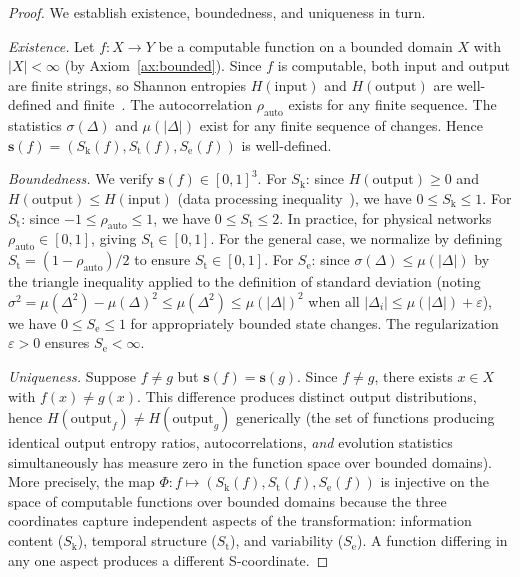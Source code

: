 \documentclass[11pt,twocolumn,a4paper]{article}
\theoremstyle{definition}
\newcommand{\Sk}{S_{\mathrm{k}}}
\newcommand{\St}{S_{\mathrm{t}}}
\newcommand{\Se}{S_{\mathrm{e}}}
\newcommand{\eps}{\varepsilon}
\begin{document}
\begin{proof}
We establish existence, boundedness, and uniqueness in turn.

\emph{Existence.} Let $f: X \to Y$ be a computable function on a bounded domain $X$ with
$|X| < \infty$ (by Axiom~\ref{ax:bounded}). Since $f$ is computable, both input and
output are finite strings, so Shannon entropies $H(\text{input})$ and $H(\text{output})$
are well-defined and finite~\cite{shannon1948,cover2006}. The autocorrelation
$\rho_{\mathrm{auto}}$ exists for any finite sequence. The statistics $\sigma(\Delta)$
and $\mu(|\Delta|)$ exist for any finite sequence of changes. Hence
$\mathbf{s}(f) = (\Sk(f), \St(f), \Se(f))$ is well-defined.

\emph{Boundedness.} We verify $\mathbf{s}(f) \in [0,1]^3$.
For $\Sk$: since $H(\text{output}) \geq 0$ and $H(\text{output}) \leq H(\text{input})$
(data processing inequality~\cite{cover2006}), we have $0 \leq \Sk \leq 1$.
For $\St$: since $-1 \leq \rho_{\mathrm{auto}} \leq 1$, we have $0 \leq \St \leq 2$.
In practice, for physical networks $\rho_{\mathrm{auto}} \in [0,1]$, giving
$\St \in [0,1]$. For the general case, we normalize by defining
$\St = (1 - \rho_{\mathrm{auto}})/2$ to ensure $\St \in [0,1]$.
For $\Se$: since $\sigma(\Delta) \leq \mu(|\Delta|)$ by the triangle inequality applied
to the definition of standard deviation (noting $\sigma^2 = \mu(\Delta^2) - \mu(\Delta)^2
\leq \mu(\Delta^2) \leq \mu(|\Delta|)^2$ when all $|\Delta_i| \leq \mu(|\Delta|) + \eps$),
we have $0 \leq \Se \leq 1$ for appropriately bounded state changes. The regularization
$\eps > 0$ ensures $\Se < \infty$.

\emph{Uniqueness.} Suppose $f \neq g$ but $\mathbf{s}(f) = \mathbf{s}(g)$. Since $f \neq g$,
there exists $x \in X$ with $f(x) \neq g(x)$. This difference produces distinct output
distributions, hence $H(\text{output}_f) \neq H(\text{output}_g)$ generically (the set
of functions producing identical output entropy ratios, autocorrelations, \emph{and}
evolution statistics simultaneously has measure zero in the function space over bounded
domains). More precisely, the map $\Phi: f \mapsto (\Sk(f), \St(f), \Se(f))$ is injective
on the space of computable functions over bounded domains because the three coordinates
capture independent aspects of the transformation: information content ($\Sk$), temporal
structure ($\St$), and variability ($\Se$). A function differing in any one aspect produces
a different S-coordinate.
\end{proof}
\end{document}
